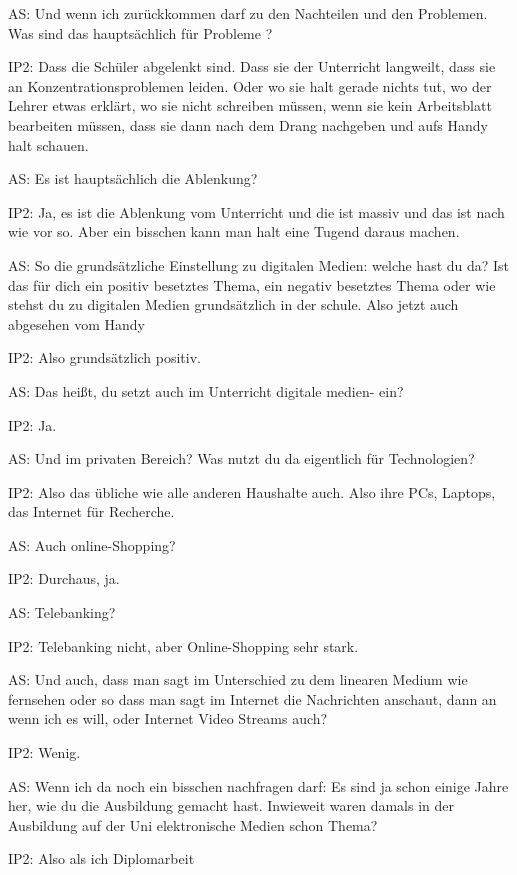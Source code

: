 \documentclass[fontsize=11pt,paper=a4]{scrbook}
\begin{document}
{\begin{itemize*}
\item[AS:] Und wenn ich zurückkommen darf zu den Nachteilen und den Problemen. Was sind das hauptsächlich für
Probleme ?
\item[IP2:] Dass die Schüler abgelenkt sind. Dass sie der Unterricht langweilt, dass sie an 
Konzentrationsproblemen leiden. Oder wo sie halt gerade nichts tut, wo der Lehrer etwas erklärt, wo sie nicht schreiben müssen, wenn sie kein Arbeitsblatt bearbeiten müssen, dass sie  dann nach dem Drang nachgeben und aufs Handy halt schauen.
\item[AS:] Es ist
hauptsächlich die Ablenkung?
\item[IP2:] Ja, es ist die Ablenkung vom Unterricht und die ist massiv und
das ist nach wie vor so. Aber ein bisschen kann man halt eine Tugend daraus machen.
\item[AS:] So die grundsätzliche
Einstellung zu digitalen Medien: welche
hast du da? Ist das für dich ein positiv
besetztes Thema, ein negativ besetztes
Thema oder wie stehst du zu digitalen
Medien grundsätzlich in der schule. Also jetzt auch abgesehen vom Handy
\item[IP2:] Also grundsätzlich positiv.
\item[AS:] Das heißt, du setzt auch im Unterricht digitale medien- ein?
\item[IP2:] Ja.
\item[AS:]  Und im
privaten Bereich? Was nutzt du da eigentlich für Technologien?
\item[IP2:]  Also das übliche wie
alle anderen Haushalte auch. Also ihre PCs, Laptops, das Internet für Recherche.
\item[AS:] Auch online-Shopping?
\item[IP2:] Durchaus, ja.
\item[AS:] Telebanking?
\item[IP2:] Telebanking nicht, aber Online-Shopping sehr stark.
\item[AS:] Und auch, dass man sagt
im Unterschied zu dem linearen Medium wie fernsehen oder so
dass man sagt im Internet die 
Nachrichten anschaut, dann an wenn ich es will, oder Internet Video Streams auch?
\item[IP2:] Wenig. 
\item[AS:] Wenn ich da noch ein bisschen nachfragen darf: Es sind ja schon einige Jahre her, wie du die Ausbildung gemacht hast. Inwieweit waren damals in der Ausbildung auf der Uni elektronische Medien schon Thema?
\item[IP2:] Also als ich Diplomarbeit 

\end{itemize*}}
\end{document}
